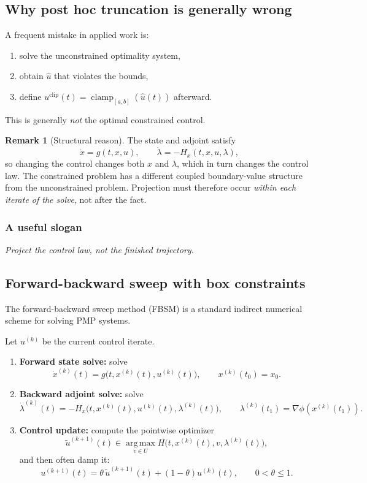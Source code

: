 \documentclass[11pt]{article}
\theoremstyle{definition}
\newtheorem{remark}{Remark}
\newcommand{\argmax}{\operatorname*{arg\,max}}
\newcommand{\clamp}{\operatorname{clamp}}
\begin{document}
\subsection{Why post hoc truncation is generally wrong}

A frequent mistake in applied work is:
\begin{enumerate}[label=(\roman*), leftmargin=2em]
    \item solve the unconstrained optimality system,
    \item obtain $\hat u$ that violates the bounds,
    \item define $u^{\text{clip}}(t)=\clamp_{[a,b]}(\hat u(t))$ afterward.
\end{enumerate}
This is generally \emph{not} the optimal constrained control.

\begin{remark}[Structural reason]
The state and adjoint satisfy
\[
\dot x = g(t,x,u),\qquad \dot\lambda = -H_x(t,x,u,\lambda),
\]
so changing the control changes both $x$ and $\lambda$, which in turn changes the control law. The constrained problem has a different coupled boundary-value structure from the unconstrained problem. Projection must therefore occur \emph{within each iterate of the solve}, not after the fact.
\end{remark}

\subsubsection*{A useful slogan}
\begin{center}
\emph{Project the control law, not the finished trajectory.}
\end{center}

\subsection{Forward-backward sweep with box constraints}

The forward-backward sweep method (FBSM) is a standard indirect numerical scheme for solving PMP systems.

Let $u^{(k)}$ be the current control iterate.

\begin{enumerate}[label=(\roman*)]
    \item \textbf{Forward state solve:}
    solve
    \[
    \dot x^{(k)}(t)=g\big(t,x^{(k)}(t),u^{(k)}(t)\big),
    \qquad x^{(k)}(t_0)=x_0.
    \]

    \item \textbf{Backward adjoint solve:}
    solve
    \[
    \dot\lambda^{(k)}(t)= -H_x\big(t,x^{(k)}(t),u^{(k)}(t),\lambda^{(k)}(t)\big),
    \qquad \lambda^{(k)}(t_1)=\nabla\phi(x^{(k)}(t_1)).
    \]

    \item \textbf{Control update:}
    compute the pointwise optimizer
    \[
    \tilde u^{(k+1)}(t)
    \in
    \argmax_{v\in U}
    H\big(t,x^{(k)}(t),v,\lambda^{(k)}(t)\big),
    \]
    and then often damp it:
    \[
    u^{(k+1)}(t)=\theta\, \tilde u^{(k+1)}(t)+(1-\theta)u^{(k)}(t),
    \qquad 0<\theta\le 1.
    \]
\end{enumerate}
\end{document}
